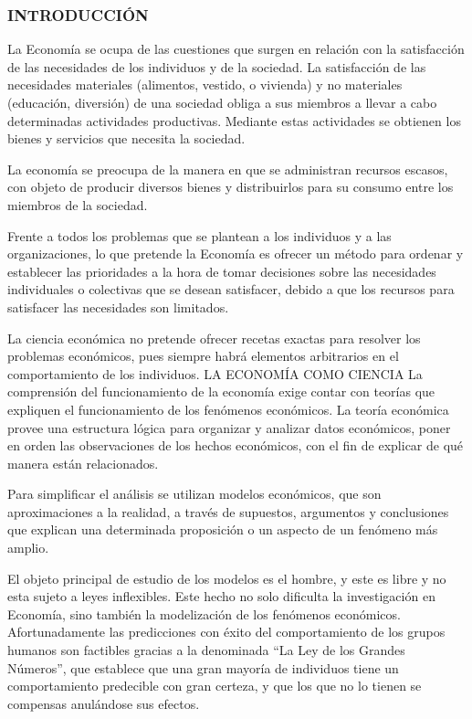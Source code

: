 \subsubsection*{INTRODUCCIÓN}
La Economía se ocupa de las cuestiones que surgen en relación con la satisfacción de las necesidades de los individuos y de la sociedad. La satisfacción de las necesidades materiales (alimentos, vestido, o vivienda) y no materiales (educación, diversión) de una sociedad obliga a sus miembros a llevar a cabo determinadas actividades productivas. Mediante estas actividades se obtienen los bienes y servicios que necesita la sociedad.

La economía se preocupa de la manera en que se administran recursos escasos, con objeto de producir diversos bienes y distribuirlos para su consumo entre los miembros de la sociedad.

Frente a todos los problemas que se plantean a los individuos y a las organizaciones, lo que pretende la Economía es ofrecer un método para ordenar y establecer las prioridades a la hora de tomar decisiones sobre las necesidades individuales o colectivas que se desean satisfacer, debido a que los recursos para satisfacer las necesidades son limitados.

La ciencia económica no pretende ofrecer recetas exactas para resolver los problemas económicos, pues siempre habrá elementos arbitrarios en el comportamiento de los individuos. LA ECONOMÍA COMO CIENCIA La comprensión del funcionamiento de la economía exige contar con teorías que expliquen el funcionamiento de los fenómenos económicos. La teoría económica provee una estructura lógica para organizar y analizar datos económicos, poner en orden las observaciones de los hechos económicos, con el fin de explicar de qué manera están relacionados.

Para simplificar el análisis se utilizan modelos económicos, que son aproximaciones a la realidad, a través de supuestos, argumentos y conclusiones que explican una determinada proposición o un aspecto de un fenómeno más amplio.

El objeto principal de estudio de los modelos es el hombre, y este es libre y no esta sujeto a leyes inflexibles. Este hecho no solo dificulta la investigación en Economía, sino también la modelización de los fenómenos económicos. Afortunadamente las predicciones con éxito del comportamiento de los grupos humanos son factibles gracias a la denominada “La Ley de los Grandes Números”, que establece que una gran mayoría de individuos tiene un comportamiento predecible con gran certeza, y que los que no lo tienen se compensas anulándose sus efectos.

